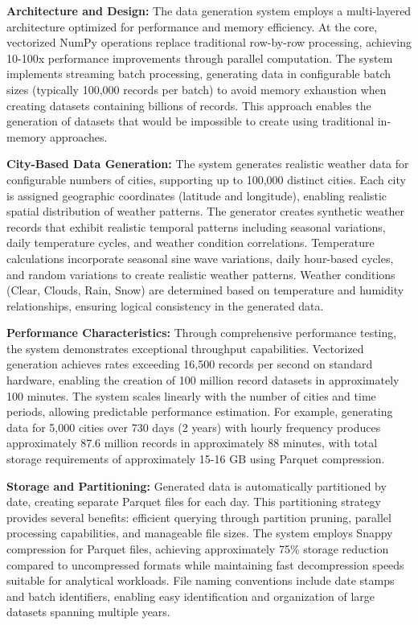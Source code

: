 \documentclass[12pt,a4paper]{article}
\begin{document}
\textbf{Architecture and Design:} The data generation system employs a multi-layered architecture optimized for performance and memory efficiency. At the core, vectorized NumPy operations replace traditional row-by-row processing, achieving 10-100x performance improvements through parallel computation. The system implements streaming batch processing, generating data in configurable batch sizes (typically 100,000 records per batch) to avoid memory exhaustion when creating datasets containing billions of records. This approach enables the generation of datasets that would be impossible to create using traditional in-memory approaches.

\textbf{City-Based Data Generation:} The system generates realistic weather data for configurable numbers of cities, supporting up to 100,000 distinct cities. Each city is assigned geographic coordinates (latitude and longitude), enabling realistic spatial distribution of weather patterns. The generator creates synthetic weather records that exhibit realistic temporal patterns including seasonal variations, daily temperature cycles, and weather condition correlations. Temperature calculations incorporate seasonal sine wave variations, daily hour-based cycles, and random variations to create realistic weather patterns. Weather conditions (Clear, Clouds, Rain, Snow) are determined based on temperature and humidity relationships, ensuring logical consistency in the generated data.

\textbf{Performance Characteristics:} Through comprehensive performance testing, the system demonstrates exceptional throughput capabilities. Vectorized generation achieves rates exceeding 16,500 records per second on standard hardware, enabling the creation of 100 million record datasets in approximately 100 minutes. The system scales linearly with the number of cities and time periods, allowing predictable performance estimation. For example, generating data for 5,000 cities over 730 days (2 years) with hourly frequency produces approximately 87.6 million records in approximately 88 minutes, with total storage requirements of approximately 15-16 GB using Parquet compression.

\textbf{Storage and Partitioning:} Generated data is automatically partitioned by date, creating separate Parquet files for each day. This partitioning strategy provides several benefits: efficient querying through partition pruning, parallel processing capabilities, and manageable file sizes. The system employs Snappy compression for Parquet files, achieving approximately 75\% storage reduction compared to uncompressed formats while maintaining fast decompression speeds suitable for analytical workloads. File naming conventions include date stamps and batch identifiers, enabling easy identification and organization of large datasets spanning multiple years.
\end{document}
